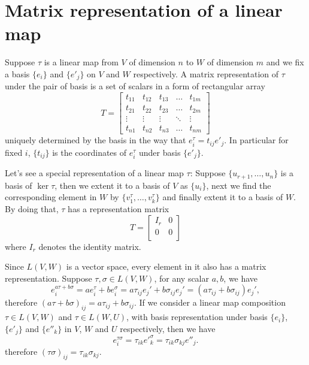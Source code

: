 \documentclass{amsbook}
\theoremstyle{definition}
\theoremstyle{remark}
\numberwithin{section}{chapter}
\numberwithin{equation}{chapter}
\begin{document}
\section{Matrix representation of a linear map}
Suppose $\tau$ is a linear map from $V$ of dimension $n$ to $W$ of dimension $m$ and we fix a basis $\{e_i\}$ and $\{e'_j\}$ on $V$ and $W$ respectively. A matrix representation of $\tau$ under the pair of basis is a set of scalars in a form of rectangular array 
\[
T=
\begin{bmatrix}
t_{11} & t_{12} & t_{13} & \dots  & t_{1m} \\
t_{21} & t_{22} & t_{23} & \dots  & t_{2m} \\
\vdots & \vdots & \vdots & \ddots & \vdots \\
t_{n1} & t_{n2} & t_{n3} & \dots  & t_{nm}
\end{bmatrix}
\]
uniquely determined by the basis in the way that $e_i^{\tau} = t_{ij} e'_j$. In particular for fixed $i$, $\{t_{ij}\}$ is the coordinates of $e_i^{\tau}$ under basis $\{e'_j\}$.

Let's see a special representation of a linear map $\tau$: Suppose $\{u_{r + 1}, \dots, u_n\}$ is a basis of $\ker{\tau}$, then we extent it to a basis of $V$ as $\{u_i\}$, next we find the corresponding element in $W$ by $\{v_1^{\tau}, \dots, v_k^{\tau}\}$ and finally extent it to a basis of $W$. By doing that, $\tau$ has a representation matrix 
\[
T=
\begin{bmatrix}
I_r & 0 \\
0 & 0 \\
\end{bmatrix}
\]
where $I_r$ denotes the identity matrix.

Since $L(V, W)$ is a vector space, every element in it also has a matrix representation. Suppose $\tau, \sigma \in L(V, W)$, for any scalar $a, b$, we have
\begin{equation*}
e_i^{a\tau + b\sigma} = ae_i^{\tau} + be_i^{\sigma} = a\tau_{ij}e_j' + b\sigma_{ij}e_j' = (a\tau_{ij} + b\sigma_{ij})e_j',
\end{equation*}
therefore $(a\tau + b\sigma)_{ij} = a\tau_{ij} + b\sigma_{ij}$. If we consider a linear map composition $\tau\in L(V, W)$ and $\tau\in L(W, U)$, with basis representation under basis $\{e_i\}$, $\{e'_j\}$ and  $\{e''_k\}$ in $V$, $W$ and $U$ respectively, then we have
\begin{equation*}
e_i^{\tau \sigma} = \tau_{ik}e'^{\sigma}_k = \tau_{ik}\sigma_{kj}e''_j.
\end{equation*}
therefore $(\tau\sigma)_{ij} = \tau_{ik}\sigma_{kj}$. 
\end{document}

